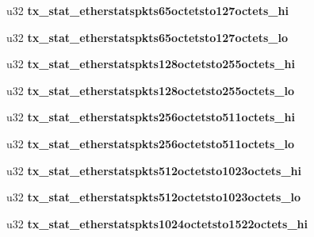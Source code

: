 \begin{DoxyCompactItemize}
\item 
\hypertarget{structbnx2x__eth__stats_a63166495d4063af0f8e892e09ff7476a}{
u32 {\bfseries tx\_\-stat\_\-etherstatspkts65octetsto127octets\_\-hi}}
\label{structbnx2x__eth__stats_a63166495d4063af0f8e892e09ff7476a}

\item 
\hypertarget{structbnx2x__eth__stats_aca8c30da5c8882c9a1b31da21444b948}{
u32 {\bfseries tx\_\-stat\_\-etherstatspkts65octetsto127octets\_\-lo}}
\label{structbnx2x__eth__stats_aca8c30da5c8882c9a1b31da21444b948}

\item 
\hypertarget{structbnx2x__eth__stats_a0cafbb453d3e131bd8346d431c39f518}{
u32 {\bfseries tx\_\-stat\_\-etherstatspkts128octetsto255octets\_\-hi}}
\label{structbnx2x__eth__stats_a0cafbb453d3e131bd8346d431c39f518}

\item 
\hypertarget{structbnx2x__eth__stats_a486b46c1b2f96530a70c188f07b559e8}{
u32 {\bfseries tx\_\-stat\_\-etherstatspkts128octetsto255octets\_\-lo}}
\label{structbnx2x__eth__stats_a486b46c1b2f96530a70c188f07b559e8}

\item 
\hypertarget{structbnx2x__eth__stats_a40770c669637866936920f27fd539257}{
u32 {\bfseries tx\_\-stat\_\-etherstatspkts256octetsto511octets\_\-hi}}
\label{structbnx2x__eth__stats_a40770c669637866936920f27fd539257}

\item 
\hypertarget{structbnx2x__eth__stats_a09233f2473490816a5ece7436eb98b61}{
u32 {\bfseries tx\_\-stat\_\-etherstatspkts256octetsto511octets\_\-lo}}
\label{structbnx2x__eth__stats_a09233f2473490816a5ece7436eb98b61}

\item 
\hypertarget{structbnx2x__eth__stats_a6a1a78b70b8c755543fb2128f9b1813e}{
u32 {\bfseries tx\_\-stat\_\-etherstatspkts512octetsto1023octets\_\-hi}}
\label{structbnx2x__eth__stats_a6a1a78b70b8c755543fb2128f9b1813e}

\item 
\hypertarget{structbnx2x__eth__stats_a15e13d6f467b64932726d3d748be5b41}{
u32 {\bfseries tx\_\-stat\_\-etherstatspkts512octetsto1023octets\_\-lo}}
\label{structbnx2x__eth__stats_a15e13d6f467b64932726d3d748be5b41}

\item 
\hypertarget{structbnx2x__eth__stats_aa3c3141821e5da27ea53bf46d306759d}{
u32 {\bfseries tx\_\-stat\_\-etherstatspkts1024octetsto1522octets\_\-hi}}
\label{structbnx2x__eth__stats_aa3c3141821e5da27ea53bf46d306759d}


\end{DoxyCompactItemize}
